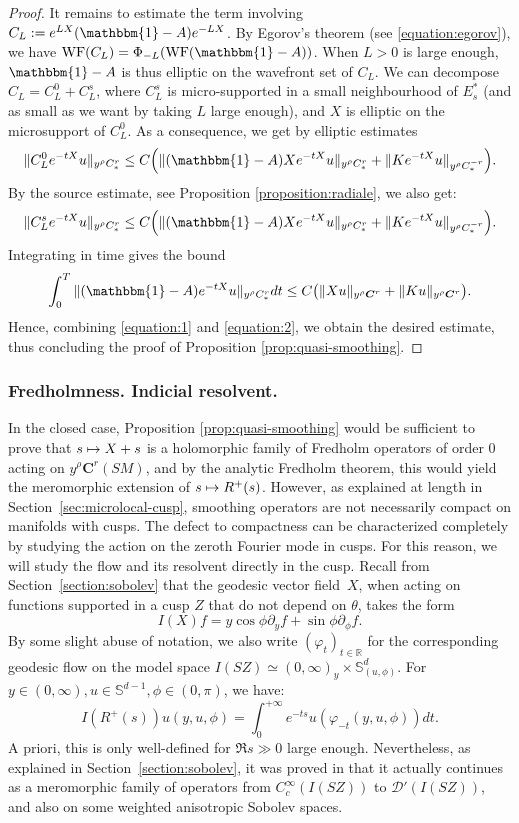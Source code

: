 \documentclass[JEP,XML,SOM,Unicode,NoFloatCountersInSection]{cedram}
\newcommand\mto{\mathchoice{\longmapsto}{\mapsto}{\mapsto}{\mapsto}}
\newcommand{\bC}{\boldsymbol{C}}
\newcommand{\R}{\mathbb{R}}
\newcommand{\Ss}{\mathbb{S}}
\newcommand{\ZZ}{I(SZ)}
\DeclareMathOperator{\WF}{WF}
\theoremstyle{plain}
\theoremstyle{definition}
\begin{document}
\begin{proof}
It remains to estimate the term involving $C_L := e^{LX}(\mathbbm{1}-A)e^{-LX}$. By Egorov's theorem (see \eqref{equation:egorov}), we have $\WF(C_L)= \Phi_{-L}(\WF(\mathbbm{1}-A))$. When $L>0$ is large enough, $\mathbbm{1}-A$ is thus elliptic on the wavefront set of $C_L$. We can decompose $C_L = C^0_L+C^s_L$, where $C^s_L$ is micro-supported in a small neighbourhood of $E^\ast_s$ (and as small as we want by taking $L$ large enough), and $X$ is elliptic on the microsupport of $C^0_L$. As a consequence, we get by elliptic estimates
\[
\|C_L^0 e^{-tX}u\|_{y^\rho C^r_*} \leq C\Bigl(\| (\mathbbm{1}-A)X e^{-tX}u\|_{y^\rho C^{r}_*} + \| K e^{-tX}u\|_{y^\rho C^{-r}_*}\Bigr).
\]
By the source estimate, see Proposition \ref{proposition:radiale}, we also get:
\[
\|C_L^s e^{-tX}u\|_{y^\rho C^r_*} \leq C\Bigl(\| (\mathbbm{1}-A)Xe^{-tX}u \|_{y^\rho C^r_*} + \| K e^{-tX}u\|_{y^\rho C^{-r}_*}\Bigr).
\]
Integrating in time gives the bound
\begin{equation}
\label{equation:2}
\int_0^T \| (\mathbbm{1}-A)e^{-tX} u\|_{y^\rho C^r_*} dt \leq C \bigl( \|Xu\|_{y^\rho \bC^r} + \|Ku\|_{y^\rho \bC^r} \bigr).
\end{equation}
Hence, combining \eqref{equation:1} and \eqref{equation:2}, we obtain the desired estimate, thus concluding the proof of Proposition \ref{prop:quasi-smoothing}.
\end{proof}

\subsubsection{Fredholmness. Indicial resolvent.}

\label{sssection:indicial-resolvent}

In the closed case, Proposition \ref{prop:quasi-smoothing} would be sufficient to prove that $s \mto X+s$ is a holomorphic family of Fredholm operators of order $0$ acting on $y^\rho \bC^r(SM)$, and by the analytic Fredholm theorem, this would yield the meromorphic extension of $s \mto R^+(s)$. However, as explained at length in Section~\ref{sec:microlocal-cusp}, smoothing operators are not necessarily compact on manifolds with cusps. The defect to compactness can be characterized completely by studying the action on the zeroth Fourier mode in cusps. For this reason, we will study the flow and its resolvent directly in the cusp. Recall from Section~\ref{section:sobolev} that the geodesic vector field~$X$, when acting on functions supported in a cusp $Z$ that do not depend on $\theta$, takes the form
\[
I(X)f = y \cos \phi \partial_y f + \sin\phi\partial_\phi f.
\]
By some slight abuse of notation, we also write $(\varphi_t)_{t \in \R}$ for the corresponding geodesic flow on the model space $\ZZ \simeq (0,\infty)_y \times \Ss^d_{(u,\phi)}$. For $y \in (0,\infty), u \in \Ss^{d-1}, \phi \in (0,\pi)$, we have:
\[
I(R^+(s)) u (y,u,\phi) = \int_0^{+\infty} e^{-t s} u(\varphi_{-t}(y,u,\phi)) dt.
\]
A priori, this is only well-defined for $\Re s\gg 0$ large enough. Nevertheless, as explained in Section~\ref{section:sobolev}, it was proved in \cite{Bonthonneau-Weich-17} that it actually continues as a meromorphic family of operators from $C^\infty_c(\ZZ)$ to $\mathcal{D}'(\ZZ)$, and also on some weighted anisotropic Sobolev spaces.
\end{document}
